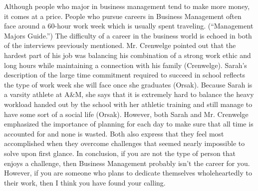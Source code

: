 \begin{multicols}{2}
    Although people who major in business management tend to make more money, it comes at a price. People who pursue careers in Business Management often face around a 60-hour work week which is usually spent traveling. (“Management Majors Guide.”) The difficulty of a career in the business world is echoed in both of the interviews previously mentioned. Mr. Crenwelge pointed out that the hardest part of his job was balancing his combination of a strong work ethic and long hours while maintaining a connection with his family (Crenwelge). Sarah’s description of the large time commitment required to succeed in school reflects the type of work week she will face once she graduates (Orsak). Because Sarah is a varsity athlete at A\&M, she says that it is extremely hard to balance the heavy workload handed out by the school with her athletic training and still manage to have some sort of a social life (Orsak). However, both Sarah and Mr. Crenwelge emphasized the importance of planning for each day to make sure that all time is accounted for and none is wasted. Both also express that they feel most accomplished when they overcome challenges that seemed nearly impossible to solve upon first glance. In conclusion, if you are not the type of person that enjoys a challenge, then Business Management probably isn’t the career for you. However, if you are someone who plans to dedicate themselves wholeheartedly to their work, then I think you have found your calling. 
\end{multicols}